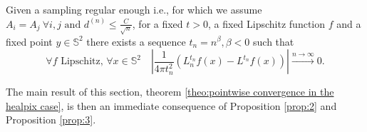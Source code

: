 \vspace{0.5cm}
\begin{prop}\label{prop:2}
	Given a sampling regular enough i.e., for which we assume $A_i=A_j \ \forall i,j\text{ and }d^{(n)}\leq \frac{C}{\sqrt{n}}$, for a fixed $t>0$, a fixed Lipschitz function $f$ and a fixed point $y\in\mathbb S^2$ there exists a sequence $t_n = n^\beta, \beta<0$ such that 
$$
\forall f \text{ Lipschitz, } \forall x\in\mathbb S^2 \quad \left|\frac{1}{4\pi t_n^2}\left(L_n^{t_n}f(x) - L^{t_n}f(x)\right)\right|\xrightarrow{n\to \infty}0.
$$
\end{prop}
\vspace{0.5cm}

The main result of this section, theorem  \ref{theo:pointwise convergence in the healpix case}, is then an immediate consequence of Proposition \ref{prop:2} and Proposition \ref{prop:3}.


